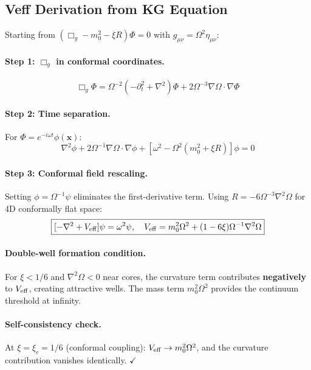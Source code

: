 \documentclass[aps,prd,onecolumn,notitlepage,nofootinbib,superscriptaddress,11pt,floatfix]{revtex4-2}
\begin{document}
\subsection{Veff Derivation from KG Equation}
\label{app:derivation}

Starting from $(\Box_g - m_0^2 - \xi R)\Phi = 0$ with $g_{\mu\nu} = \Omega^2 \eta_{\mu\nu}$:

\paragraph{Step 1: $\Box_g$ in conformal coordinates.}
\begin{equation}
\Box_g \Phi = \Omega^{-2}(-\partial_t^2 + \nabla^2)\Phi + 2\Omega^{-3}\nabla\Omega \cdot \nabla\Phi
\end{equation}

\paragraph{Step 2: Time separation.}
For $\Phi = e^{-i\omega t}\phi(\mathbf{x})$:
\begin{equation}
\nabla^2\phi + 2\Omega^{-1}\nabla\Omega\cdot\nabla\phi + [\omega^2 - \Omega^2(m_0^2 + \xi R)]\phi = 0
\end{equation}

\paragraph{Step 3: Conformal field rescaling.}
Setting $\phi = \Omega^{-1}\psi$ eliminates the first-derivative term. Using $R = -6\Omega^{-3}\nabla^2\Omega$ for 4D conformally flat space:
\begin{equation}
\boxed{[-\nabla^2 + V_{\rm eff}]\psi = \omega^2\psi, \quad V_{\rm eff} = m_0^2\Omega^2 + (1-6\xi)\Omega^{-1}\nabla^2\Omega}
\label{eq:Veff_action}
\end{equation}

\paragraph{Double-well formation condition.}
For $\xi < 1/6$ and $\nabla^2\Omega < 0$ near cores, the curvature term contributes \textbf{negatively} to $V_{\rm eff}$, creating attractive wells. The mass term $m_0^2\Omega^2$ provides the continuum threshold at infinity.

\paragraph{Self-consistency check.}
At $\xi = \xi_c = 1/6$ (conformal coupling): $V_{\rm eff} \to m_0^2\Omega^2$, and the curvature contribution vanishes identically. $\checkmark$
\end{document}
